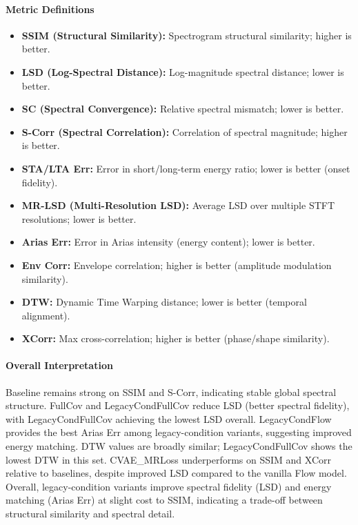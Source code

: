 \paragraph{Metric Definitions}
\begin{itemize}
\item \textbf{SSIM (Structural Similarity):} Spectrogram structural similarity; higher is better.
\item \textbf{LSD (Log-Spectral Distance):} Log-magnitude spectral distance; lower is better.
\item \textbf{SC (Spectral Convergence):} Relative spectral mismatch; lower is better.
\item \textbf{S-Corr (Spectral Correlation):} Correlation of spectral magnitude; higher is better.
\item \textbf{STA/LTA Err:} Error in short/long-term energy ratio; lower is better (onset fidelity).
\item \textbf{MR-LSD (Multi-Resolution LSD):} Average LSD over multiple STFT resolutions; lower is better.
\item \textbf{Arias Err:} Error in Arias intensity (energy content); lower is better.
\item \textbf{Env Corr:} Envelope correlation; higher is better (amplitude modulation similarity).
\item \textbf{DTW:} Dynamic Time Warping distance; lower is better (temporal alignment).
\item \textbf{XCorr:} Max cross-correlation; higher is better (phase/shape similarity).
\end{itemize}

\paragraph{Overall Interpretation}
Baseline remains strong on SSIM and S-Corr, indicating stable global spectral structure. FullCov and LegacyCondFullCov
reduce LSD (better spectral fidelity), with LegacyCondFullCov achieving the lowest LSD overall. LegacyCondFlow provides the best
Arias Err among legacy-condition variants, suggesting improved energy matching. DTW values are broadly similar; LegacyCondFullCov shows
the lowest DTW in this set. CVAE\_MRLoss underperforms on SSIM and XCorr relative to baselines, despite improved
LSD compared to the vanilla Flow model. Overall, legacy-condition variants improve spectral fidelity (LSD) and energy
matching (Arias Err) at slight cost to SSIM, indicating a trade-off between structural similarity and spectral detail.
